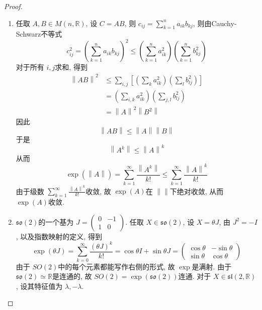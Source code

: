 \documentclass[../main.tex]{subfiles}
\begin{document}
\begin{proof}
    \begin{enumerate}
        \item 任取 \(  A,B\in M\left( n,\mathbb{R}  \right)   \), 设 \(  C= AB  \), 则 \(  c_{ij}= \sum _{k= 1}^{n}a_{ik}b_{kj}  \), 则由Cauchy-Schwarz不等式 \[
        c_{ij}^{2}= \left( \sum _{k= 1}^{n}a_{ik}b_{kj} \right)^{2}\le \left( \sum _{k= 1}^{n}a_{ik}^{2} \right)\left( \sum _{k= 1}^{n}b_{kj}^{2} \right)   
        \]   对于所有 \(  i,j  \)求和, 得到 \[
      \begin{aligned}
        \left\| AB \right\|^{2}&\le \sum _{i,j}\left[ \left( \sum _{k}a_{ik}^{2} \right)  \left( \sum _{l} b_{lj}^{2}\right) \right]\\ 
         &= \left( \sum _{i,k}a_{ik}^{2} \right)\left( \sum _{j,l}b_{lj}^{2} \right)\\ 
          &= \left\| A \right\|^{2}\left\| B^{2} \right\|  
      \end{aligned} 
        \]因此 \[
        \left\| AB \right\|\le \left\| A \right\|\left\| B \right\|
        \] 于是 \[
        \left\| A^{k} \right\|\le \left\| A \right\|^{k}
        \]从而 \[
        \exp \left( \left\| A \right\| \right) = \sum _{k= 1}^{\infty}\frac{\left\| A^{k} \right\| }{k! } \le \sum _{k= 1}^{\infty}\frac{\left\| A \right\|^{k} }{k! } 
        \]由于级数 \(  \sum _{k= 1}^{\infty}\frac{\left\| A \right\|^{k} }{k! }   \)收敛, 故 \(\exp \left( A \right)     \)在 \(  \left\|  \right\|  \)下绝对收敛, 从而 \(  \exp \left( A \right)   \)收敛.
        \item  \(  \mathfrak{so}\left( 2 \right)   \)的一个基为  \(  J= \begin{pmatrix} 
            0&-1\\ 
             1&0 
        \end{pmatrix}   \). 任取 \(  X \in \mathfrak{so}\left( 2 \right)   \), 设 \(  X=  \theta J  \), 由 \(  J^{2}= -I  \), 以及指数映射的定义, 得到 \[
        \exp \left(  \theta J \right)= \sum _{k= 0}^{\infty}\frac{\left(  \theta J \right)^{k}  }{k! }= \cos  \theta I+ \sin  \theta J=  \begin{pmatrix} 
            \cos  \theta &-\sin  \theta \\ 
             \sin  \theta &\cos  \theta  
        \end{pmatrix}   
        \]     由于 \(  SO\left( 2 \right)   \)中的每个元素都能写作右侧的形式, 故 \(  \exp   \)是满射. 由于 \(  \mathfrak{so}\left( 2 \right)\simeq \mathbb{R}    \)是连通的, 故 \(  SO\left( 2 \right)= \exp \left( \mathfrak{so}\left( 2 \right)  \right)    \)连通.    对于 \(  X \in \mathfrak{sl}\left( 2,\mathbb{R}  \right)   \), 设其特征值为 \(   \lambda ,- \lambda   \). 

\end{enumerate}
\end{proof}
\end{document}
